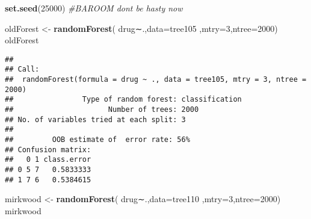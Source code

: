\documentclass[]{article}
\newenvironment{Shaded}{\begin{snugshade}}{\end{snugshade}}
\newcommand{\KeywordTok}[1]{\textcolor[rgb]{0.13,0.29,0.53}{\textbf{#1}}}
\newcommand{\DataTypeTok}[1]{\textcolor[rgb]{0.13,0.29,0.53}{#1}}
\newcommand{\DecValTok}[1]{\textcolor[rgb]{0.00,0.00,0.81}{#1}}
\newcommand{\StringTok}[1]{\textcolor[rgb]{0.31,0.60,0.02}{#1}}
\newcommand{\CommentTok}[1]{\textcolor[rgb]{0.56,0.35,0.01}{\textit{#1}}}
\newcommand{\OperatorTok}[1]{\textcolor[rgb]{0.81,0.36,0.00}{\textbf{#1}}}
\newcommand{\NormalTok}[1]{#1}
\begin{document}
\begin{Shaded}
\end{Shaded}

\begin{Shaded}
\begin{Highlighting}[]
\KeywordTok{set.seed}\NormalTok{(}\DecValTok{25000}\NormalTok{)}
\CommentTok{#BAROOM dont be hasty now}

\NormalTok{oldForest <-}\StringTok{ }\KeywordTok{randomForest}\NormalTok{( drug∼.,}\DataTypeTok{data=}\NormalTok{tree105  ,}\DataTypeTok{mtry=}\DecValTok{3}\NormalTok{,}\DataTypeTok{ntree=}\DecValTok{2000}\NormalTok{)}
\NormalTok{oldForest}
\end{Highlighting}
\end{Shaded}

\begin{verbatim}
## 
## Call:
##  randomForest(formula = drug ~ ., data = tree105, mtry = 3, ntree = 2000) 
##                Type of random forest: classification
##                      Number of trees: 2000
## No. of variables tried at each split: 3
## 
##         OOB estimate of  error rate: 56%
## Confusion matrix:
##   0 1 class.error
## 0 5 7   0.5833333
## 1 7 6   0.5384615
\end{verbatim}

\begin{Shaded}
\begin{Highlighting}[]
\NormalTok{mirkwood <-}\StringTok{ }\KeywordTok{randomForest}\NormalTok{( drug∼.,}\DataTypeTok{data=}\NormalTok{tree110  ,}\DataTypeTok{mtry=}\DecValTok{3}\NormalTok{,}\DataTypeTok{ntree=}\DecValTok{2000}\NormalTok{)}
\NormalTok{mirkwood}
\end{Highlighting}
\end{Shaded}
\end{document}
